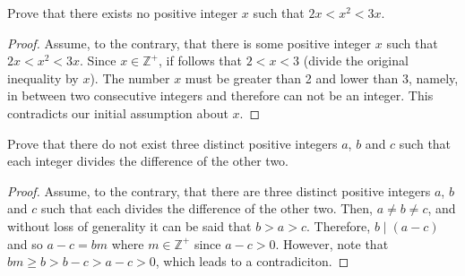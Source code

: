 \documentclass[12pt]{article}
\newcommand{\Z}{\mathbb{Z}}
\newenvironment{problem}[2][Problem]{\begin{trivlist}
		\item[\hskip \labelsep {\bfseries #1}\hskip \labelsep {\bfseries #2.}]}{\end{trivlist}}
\begin{document}
	\begin{problem}{24}
		Prove that there exists no positive integer $x$ such that $2x<x^{2}<3x$.
		\begin{proof}
			Assume, to the contrary, that there is some positive integer $x$ such that $2x<x^{2}<3x$. Since $x\in \Z^{+}$, if follows that  $2 < x < 3$ (divide the original inequality by $x$). The number $x$ must be greater than 2 and lower than 3, namely, in between two consecutive integers and therefore can not be an integer. This contradicts our initial assumption about $x$. 
		\end{proof}
	\end{problem} 

	\begin{problem}{25}
		Prove that there do not exist three distinct positive integers $a$, $b$ and $c$ such that each integer divides the difference of the other two.
		\begin{proof}
			Assume, to the contrary, that there are three distinct positive integers $a$, $b$ and $c$ such that each divides the difference of the other two. Then, $a\neq b \neq c$, and without loss of generality it can be said that $b>a>c$. Therefore, $b\mid (a-c)$ and so $a-c = bm$ where $m\in \Z^{+}$ since $a-c>0$. However, note that $bm\geq b>b-c>a-c>0$, which leads to a contradiciton.
		\end{proof}
	\end{problem}
\end{document}
